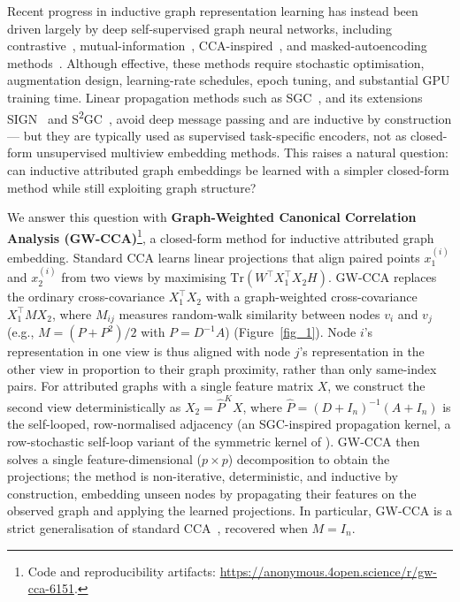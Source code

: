 \documentclass{article}
\begin{document}
Recent progress in inductive graph representation learning has instead
been driven largely by deep self-supervised graph neural networks,
including contrastive~\citep{zhu2020deep,thakoor2022bgrl},
mutual-information~\citep{velickovic2019deep,peng2020graph},
CCA-inspired~\citep{zhang2021ccassg,bielak2022graphbt}, and
masked-autoencoding methods~\citep{hou2023graphmae2}. Although effective,
these methods require stochastic optimisation, augmentation design,
learning-rate schedules, epoch tuning, and substantial GPU training time.
Linear propagation methods such as SGC~\citep{wu2019simplifying}, and its
extensions SIGN~\citep{frasca2020sign} and
S\textsuperscript{2}GC~\citep{zhu2021ssgc}, avoid deep message passing and
are inductive by construction --- but they are typically used as
supervised task-specific encoders, not as closed-form unsupervised
multiview embedding methods. This raises a natural question: can inductive
attributed graph embeddings be learned with a simpler closed-form method
while still exploiting graph structure?

We answer this question with \textbf{Graph-Weighted Canonical Correlation
Analysis (GW-CCA)}\footnote{Code and reproducibility artifacts:
\url{https://anonymous.4open.science/r/gw-cca-6151}.}, a closed-form
method for inductive attributed graph embedding. Standard CCA learns linear projections that align paired points
$x_1^{(i)}$ and $x_2^{(i)}$ from two views by maximising
$\mathrm{Tr}(W^\top X_1^\top X_2 H)$. GW-CCA replaces the ordinary
cross-covariance $X_1^\top X_2$ with a graph-weighted cross-covariance
$X_1^\top M X_2$, where $M_{ij}$ measures random-walk similarity between
nodes $v_i$ and $v_j$ (e.g., $M = (P + P^2)/2$ with $P = D^{-1}A$)
(Figure~\ref{fig_1}). Node $i$'s representation in one view is thus
aligned with node $j$'s representation in the other view in proportion to
their graph proximity, rather than only same-index pairs. For attributed
graphs with a single feature matrix $X$, we construct the second view
deterministically as $X_2 = \widehat{P}^K X$, where
$\widehat{P} = (D + I_n)^{-1}(A + I_n)$ is the self-looped,
row-normalised adjacency (an SGC-inspired propagation kernel, a
row-stochastic self-loop variant of the symmetric kernel of
\citet{wu2019simplifying}). GW-CCA then solves a single
feature-dimensional ($p \times p$) decomposition to obtain the
projections; the method is non-iterative, deterministic, and inductive by
construction, embedding unseen nodes by propagating their features on the
observed graph and applying the learned projections. In particular, GW-CCA
is a strict generalisation of standard
CCA~\citep{hotelling1992relations}, recovered when $M = I_n$.
\end{document}

